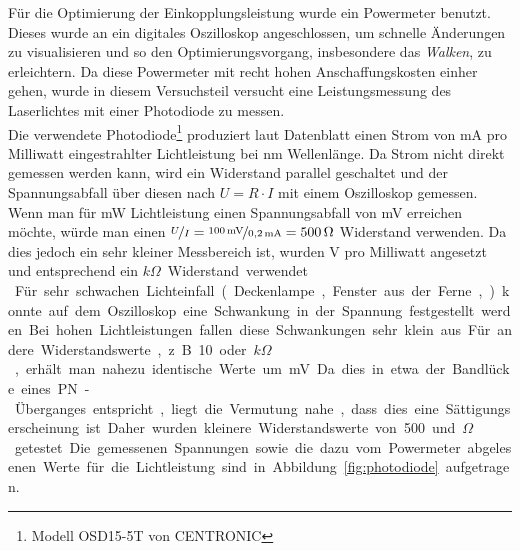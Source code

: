 
Für die Optimierung der Einkopplungsleistung wurde ein Powermeter benutzt. Dieses wurde an ein digitales Oszilloskop angeschlossen, um schnelle Änderungen zu visualisieren und so den Optimierungsvorgang, insbesondere das \textit{Walken}, zu erleichtern. Da diese Powermeter mit recht hohen Anschaffungskosten einher gehen, wurde in diesem Versuchsteil versucht eine Leistungsmessung des Laserlichtes mit einer Photodiode zu messen.\\

Die verwendete Photodiode\footnote{Modell OSD15-5T von CENTRONIC\cite{farnell.com_osd15-5t_????}} produziert laut Datenblatt einen Strom von \unit[0,18-0,21]{mA} pro Milliwatt eingestrahlter Lichtleistung bei \unit[436]{nm} Wellenlänge. Da Strom nicht direkt gemessen werden kann, wird ein Widerstand parallel geschaltet und der Spannungsabfall über diesen nach $U=R\cdot I$ mit einem Oszilloskop gemessen. Wenn man für \unit[1]{mW} Lichtleistung einen Spannungsabfall von \unit[100]{mV} erreichen möchte, würde man einen $\nicefrac{U}{I}=\nicefrac{\unit[100]{mV}}{\unit[0,2]{mA}}=\unit[500]{\Omega}$ Widerstand verwenden. Da dies jedoch ein sehr kleiner Messbereich ist, wurden \unit[4]{V} pro Milliwatt angesetzt und entsprechend ein \unit[20]{$k\Omega$} Widerstand verwendet.\\

Für sehr schwachen Lichteinfall (Deckenlampe, Fenster aus der Ferne, ...) konnte auf dem Oszilloskop eine Schwankung in der Spannung festgestellt werden. Bei hohen Lichtleistungen fallen diese Schwankungen sehr klein aus. Für andere Widerstandswerte, z.B. 10 oder \unit[100]{$k\Omega$}, erhält man nahezu identische Werte um \unit[440]{mV}. Da dies in etwa der Bandlücke eines PN-Überganges entspricht, liegt die Vermutung nahe, dass dies eine Sättigungserscheinung ist.

Daher wurden kleinere Widerstandswerte von 500 und \unit[1000]{$\Omega$} getestet. Die gemessenen Spannungen sowie die dazu vom Powermeter abgelesenen Werte für die Lichtleistung sind in Abbildung~\ref{fig:photodiode} aufgetragen.


